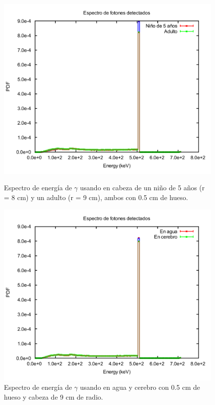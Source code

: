 \documentclass[12pt,a4paper,onecolumn]{article}
\begin{document}
\begin{figure}[H]
	\centering
	\begin{minipage}{0.45\textwidth}
		\centering
		\includegraphics[scale=0.3]{2_nino5_vs_adulto}
		\caption{Espectro de energía de $\gamma$ usando  en cabeza de un niño de 5 años (r = 8 cm) y un adulto (r = 9 cm), ambos con 0.5 cm de hueso.} 
		\label{fig:2nino5vsadult}
	\end{minipage}
	\hspace{5mm}
	\begin{minipage}{0.45\textwidth}
		\centering
		\includegraphics[scale=0.3]{2brainvswater}
		\caption{Espectro de energía de $\gamma$ usando  en agua y cerebro con 0.5 cm de hueso y cabeza de 9 cm de radio.}
		\label{fig:2brainvswater}  
	\end{minipage}	
\end{figure}
\end{document}
